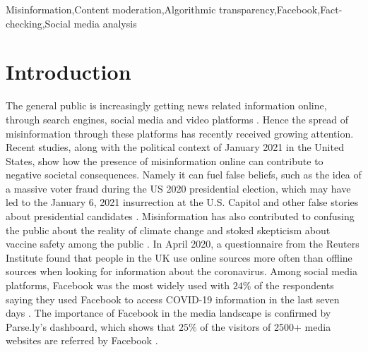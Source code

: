 \documentclass[review]{elsarticle}
\begin{document}
\begin{frontmatter}
\begin{abstract}
\end{abstract}

\begin{keyword}
Misinformation\sep Content moderation\sep Algorithmic transparency\sep Facebook\sep Fact-checking\sep Social media analysis
\end{keyword}

\end{frontmatter}

\linenumbers

\section{Introduction}

The general public is increasingly getting news related information online, through search engines, social media and video platforms \citep{mitchell2016modern}.
Hence the spread of misinformation through these platforms has recently received growing attention.
Recent studies, along with the political context of January 2021 in the United States, show how the presence of misinformation online can contribute to negative societal consequences.
Namely it can fuel false beliefs, such as the idea of a massive voter fraud during the US 2020 presidential election, which may have led to the January 6, 2021 insurrection at the U.S. Capitol \citep{benkler2020mail} and other false stories about presidential candidates \citep{allcott2017social}. 
Misinformation has also contributed to confusing the public about the reality of climate change \citep{brulle30years, porter2019can} and stoked skepticism about vaccine safety among the public \citep{featherstone2020feeling, lahouati2020spread, pierri2021impact}. 
In April 2020, a questionnaire from the Reuters Institute found that people in the UK use online sources more often than offline sources when looking for information about the coronavirus. 
Among social media platforms, Facebook was the most widely used with $24\%$ of the respondents saying they used Facebook to access COVID-19 information in the last seven days \citep{fletcher2020information}.
The importance of Facebook in the media landscape is confirmed by Parse.ly’s dashboard, which shows that $25\%$ of the visitors of 2500+ media websites are referred by Facebook \citep{parslyDashboard}.
\end{document}
